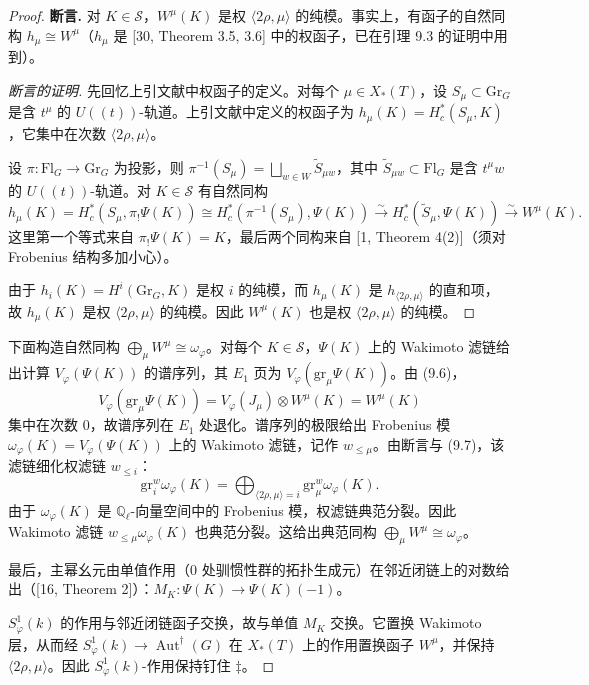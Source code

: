 \begin{proof}
\medskip\noindent\textbf{断言.} 对 $K\in\mathcal S$，$W^\mu(K)$ 是权 $\langle2\rho,\mu\rangle$ 的纯模。事实上，有函子的自然同构 $h_\mu\cong W^\mu$（$h_\mu$ 是 [30, Theorem 3.5, 3.6] 中的权函子，已在引理 9.3 的证明中用到）。

\begin{proof}[断言的证明]
先回忆上引文献中权函子的定义。对每个 $\mu\in X_*(T)$，设 $S_\mu\subset\mathrm{Gr}_G$ 是含 $t^\mu$ 的 $U((t))$-轨道。上引文献中定义的权函子为 $h_\mu(K)=H^*_c(S_\mu,K)$，它集中在次数 $\langle2\rho,\mu\rangle$。

设 $\pi:\mathrm{Fl}_G\to\mathrm{Gr}_G$ 为投影，则 $\pi^{-1}(S_\mu)=\bigsqcup_{w\in W}\widetilde S_{\mu w}$，其中 $\widetilde S_{\mu w}\subset\mathrm{Fl}_G$ 是含 $t^\mu w$ 的 $U((t))$-轨道。对 $K\in\mathcal S$ 有自然同构
\[
h_\mu(K)=H^*_c(S_\mu,\pi_!\Psi(K))\cong H^*_c(\pi^{-1}(S_\mu),\Psi(K))\xrightarrow{\sim}H^*_c(\widetilde S_\mu,\Psi(K))\xrightarrow{\sim}W^\mu(K).
\]
这里第一个等式来自 $\pi_!\Psi(K)=K$，最后两个同构来自 [1, Theorem 4(2)]（须对 Frobenius 结构多加小心）。

由于 $h_i(K)=H^i(\mathrm{Gr}_G,K)$ 是权 $i$ 的纯模，而 $h_\mu(K)$ 是 $h_{\langle2\rho,\mu\rangle}$ 的直和项，故 $h_\mu(K)$ 是权 $\langle2\rho,\mu\rangle$ 的纯模。因此 $W^\mu(K)$ 也是权 $\langle2\rho,\mu\rangle$ 的纯模。
\end{proof}

下面构造自然同构 $\bigoplus_\mu W^\mu\cong\omega_\varphi$。对每个 $K\in\mathcal S$，$\Psi(K)$ 上的 Wakimoto 滤链给出计算 $V_\varphi(\Psi(K))$ 的谱序列，其 $E_1$ 页为 $V_\varphi(\mathrm{gr}_\mu\Psi(K))$。由 (9.6)，
\begin{equation}
V_\varphi(\mathrm{gr}_\mu\Psi(K))=V_\varphi(J_\mu)\otimes W^\mu(K)=W^\mu(K)
\end{equation}
集中在次数 $0$，故谱序列在 $E_1$ 处退化。谱序列的极限给出 Frobenius 模 $\omega_\varphi(K)=V_\varphi(\Psi(K))$ 上的 Wakimoto 滤链，记作 $w_{\le\mu}$。由断言与 (9.7)，该滤链细化权滤链 $w_{\le i}$：
\[
\mathrm{gr}^w_i\omega_\varphi(K)=\bigoplus_{\langle2\rho,\mu\rangle=i}\mathrm{gr}^w_\mu\omega_\varphi(K).
\]
由于 $\omega_\varphi(K)$ 是 $\mathbb{Q}_\ell$-向量空间中的 Frobenius 模，权滤链典范分裂。因此 Wakimoto 滤链 $w_{\le\mu}\omega_\varphi(K)$ 也典范分裂。这给出典范同构 $\bigoplus_\mu W^\mu\cong\omega_\varphi$。

最后，主幂幺元由单值作用（$0$ 处驯惯性群的拓扑生成元）在邻近闭链上的对数给出（[16, Theorem 2]）：$M_K:\Psi(K)\to\Psi(K)(-1)$。

$S^1_\varphi(k)$ 的作用与邻近闭链函子交换，故与单值 $M_K$ 交换。它置换 Wakimoto 层，从而经 $S^1_\varphi(k)\to\operatorname{Aut}^\dagger(G)$ 在 $X_*(T)$ 上的作用置换函子 $W^\mu$，并保持 $\langle2\rho,\mu\rangle$。因此 $S^1_\varphi(k)$-作用保持钉住 $\ddagger$。
\end{proof}
